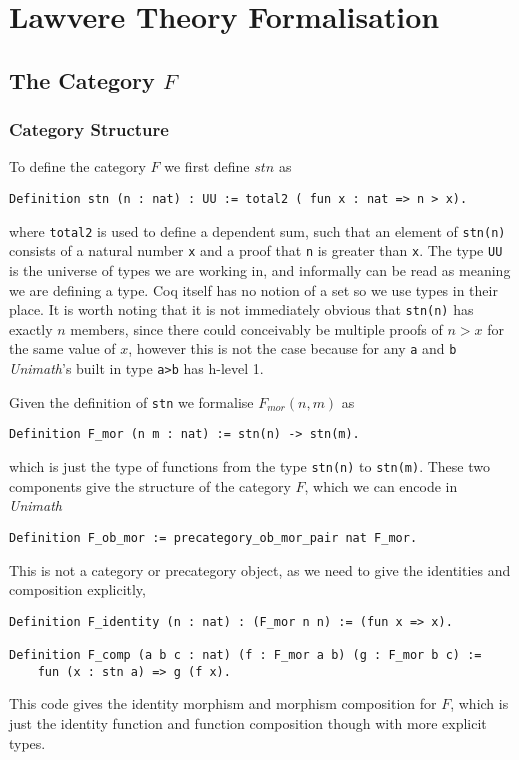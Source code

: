 \chapter{Lawvere Theory Formalisation}

\section{The Category $F$}
\subsection{Category Structure}
To define the category $F$ we first define $stn$ as
%
\begin{lstlisting}
Definition stn (n : nat) : UU := total2 ( fun x : nat => n > x).
\end{lstlisting}
%
where \verb|total2| is used to define a dependent sum, such that an element of
\verb|stn(n)| consists of a natural number \verb|x| and a proof that \verb|n| is
greater than \verb|x|. The type \verb|UU| is the universe of types we are
working in, and informally can be read as meaning we are defining a type. Coq
itself has no notion of a set so we use types in their place. It is worth
noting that it is not immediately obvious that \verb|stn(n)| has exactly $n$
members, since there could conceivably be multiple proofs of $n>x$ for the same
value of $x$, however this is not the case because for any \verb|a| and \verb|b|
\textit{Unimath}'s built in type \verb|a>b| has h-level 1.

Given the definition of \verb|stn| we formalise $F_{mor}(n,m)$ as
%
\begin{lstlisting}
Definition F_mor (n m : nat) := stn(n) -> stn(m).
\end{lstlisting}
%
which is just the type of functions from the type \verb|stn(n)| to
\verb|stn(m)|. These two components give the structure of the category $F$,
which we can encode in \textit{Unimath}
%
\begin{lstlisting}
Definition F_ob_mor := precategory_ob_mor_pair nat F_mor.
\end{lstlisting}

This is not a category or precategory object, as we need to give the identities
and composition explicitly,
%
\begin{lstlisting}
Definition F_identity (n : nat) : (F_mor n n) := (fun x => x).

Definition F_comp (a b c : nat) (f : F_mor a b) (g : F_mor b c) :=
    fun (x : stn a) => g (f x).
\end{lstlisting}
%
This code gives the identity morphism and morphism composition for $F$, which is
just the identity function and function composition though with more explicit
types.

